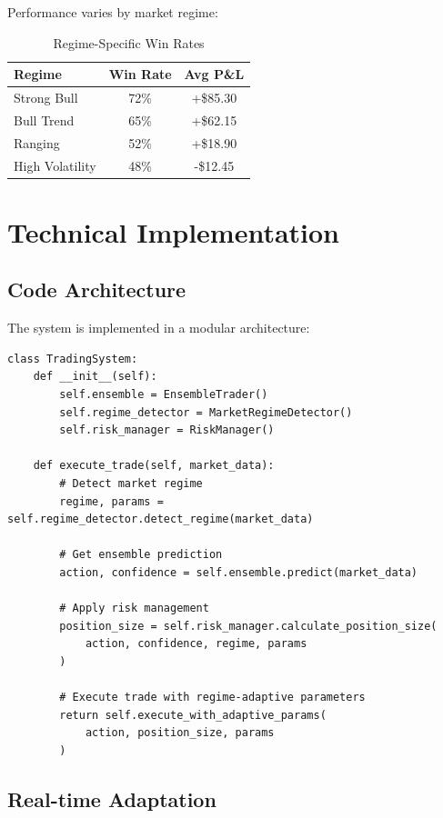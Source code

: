 \documentclass[11pt,a4paper]{article}
\begin{document}
Performance varies by market regime:

\begin{table}[H]
\centering
\caption{Regime-Specific Win Rates}
\label{tab:regime_performance}
\begin{tabular}{@{}lcc@{}}
\toprule
Regime & Win Rate & Avg P\&L \\
\midrule
Strong Bull & 72\% & +\$85.30 \\
Bull Trend & 65\% & +\$62.15 \\
Ranging & 52\% & +\$18.90 \\
High Volatility & 48\% & -\$12.45 \\
\bottomrule
\end{tabular}
\end{table}

\section{Technical Implementation}

\subsection{Code Architecture}

The system is implemented in a modular architecture:

\begin{lstlisting}[caption=Main System Components]
class TradingSystem:
    def __init__(self):
        self.ensemble = EnsembleTrader()
        self.regime_detector = MarketRegimeDetector()
        self.risk_manager = RiskManager()

    def execute_trade(self, market_data):
        # Detect market regime
        regime, params = self.regime_detector.detect_regime(market_data)

        # Get ensemble prediction
        action, confidence = self.ensemble.predict(market_data)

        # Apply risk management
        position_size = self.risk_manager.calculate_position_size(
            action, confidence, regime, params
        )

        # Execute trade with regime-adaptive parameters
        return self.execute_with_adaptive_params(
            action, position_size, params
        )
\end{lstlisting}

\subsection{Real-time Adaptation}
\end{document}
